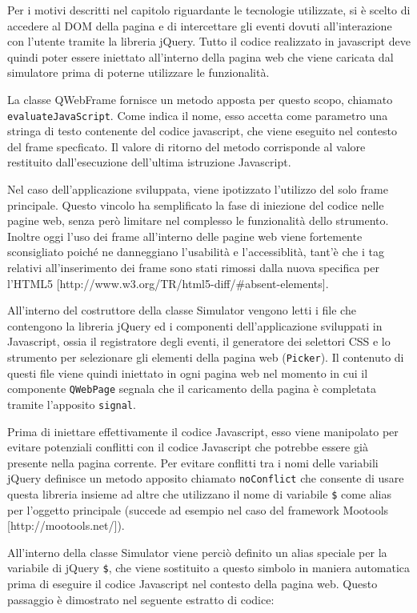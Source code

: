 \documentclass[12pt]{toptesi}
\begin{document}
Per i motivi descritti nel capitolo riguardante le tecnologie utilizzate, si è scelto di accedere al DOM della pagina e di intercettare gli eventi dovuti all'interazione con l'utente tramite la libreria jQuery. Tutto il codice realizzato in javascript deve quindi poter essere iniettato all'interno della pagina web che viene caricata dal simulatore prima di poterne utilizzare le funzionalità. 

La classe QWebFrame fornisce un metodo apposta per questo scopo, chiamato \verb|evaluateJavaScript|. Come indica il nome, esso accetta come parametro una stringa di testo contenente del codice javascript, che viene eseguito nel contesto del frame specficato. Il valore di ritorno del metodo corrisponde al valore restituito dall'esecuzione dell'ultima istruzione Javascript.

Nel caso dell'applicazione sviluppata, viene ipotizzato l'utilizzo del solo frame principale. Questo vincolo ha semplificato la fase di iniezione del codice nelle pagine web, senza però limitare nel complesso le funzionalità dello strumento. Inoltre oggi l'uso dei frame all'interno delle pagine web viene fortemente sconsigliato poiché ne danneggiano l'usabilità e l'accessiblità, tant'è che i tag relativi all'inserimento dei frame sono stati rimossi dalla nuova specifica per l'HTML5 [http://www.w3.org/TR/html5-diff/\#absent-elements]. 

All'interno del costruttore della classe Simulator vengono letti i file che contengono la libreria jQuery ed i componenti dell'applicazione sviluppati in Javascript, ossia il registratore degli eventi, il generatore dei selettori CSS e lo strumento per selezionare gli elementi della pagina web (\verb|Picker|). Il contenuto di questi file viene quindi iniettato in ogni pagina web nel momento in cui il componente \verb|QWebPage| segnala che il caricamento della pagina è completata tramite l'apposito  \verb|signal|. 

Prima di iniettare effettivamente il codice Javascript, esso viene manipolato per evitare potenziali conflitti con il codice Javascript che potrebbe essere già presente nella pagina corrente. Per evitare conflitti tra i nomi delle variabili jQuery definisce un metodo apposito chiamato \verb|noConflict| che consente di usare questa libreria insieme ad altre che utilizzano il nome di variabile \verb|$| come alias per l'oggetto principale (succede ad esempio nel caso del framework Mootools [http://mootools.net/]). 

All'interno della classe Simulator viene perciò definito un alias speciale per la variabile di jQuery \verb|$|, che viene sostituito a questo simbolo in maniera automatica prima di eseguire il codice Javascript nel contesto della pagina web. Questo passaggio è dimostrato nel seguente estratto di codice:
\end{document}
